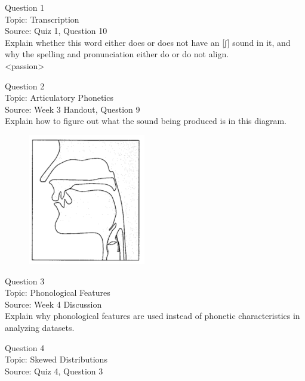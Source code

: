 \documentclass[12pt]{article}
\begin{document}
{\large Question 1}\\

Topic: Transcription\\
Source: Quiz 1, Question 10\\

Explain whether this word either does or does not have an [ʃ] sound in it, and why the spelling and pronunciation either do or do not align.\\

<passion>


\newpage

{\large Question 2}\\

Topic: Articulatory Phonetics\\
Source: Week 3 Handout, Question 9\\

Explain how to figure out what the sound being produced is in this diagram.\\

\begin{figure}[H]
\includegraphics{../images/sagittal_t.png}
\end{figure}

\newpage

{\large Question 3}\\

Topic: Phonological Features\\
Source: Week 4 Discussion\\

Explain why phonological features are used instead of phonetic characteristics in analyzing datasets.\\


\newpage

{\large Question 4}\\

Topic: Skewed Distributions\\
Source: Quiz 4, Question 3\\
\end{document}
